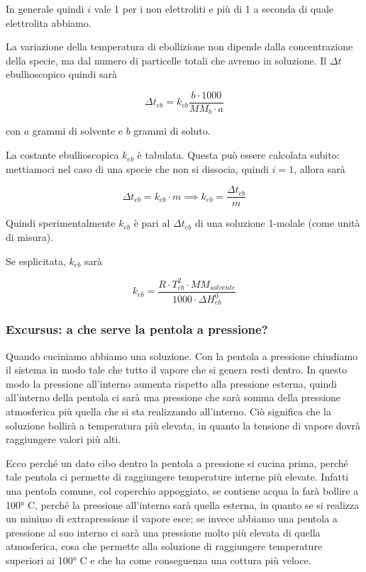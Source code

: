 In generale quindi $i$ vale 1 per i non elettroliti e più di 1 a seconda di quale elettrolita abbiamo.

\vspace{0.2cm}La variazione della temperatura di ebollizione non dipende dalla concentrazione della specie, ma dal numero di particelle totali che avremo in soluzione. Il $\Delta t$ ebullioscopico quindi sarà

$$\Delta t_{eb}=k_{eb} \frac{b \cdot 1000}{MM_b \cdot a}$$

con $a$ grammi di solvente e $b$ grammi di soluto.

La costante ebullioscopica $k_{eb}$ è tabulata. Questa può essere calcolata subito: mettiamoci nel caso di una specie che non si dissocia, quindi $i=1$, allora sarà

$$\Delta t_{eb}= k_{eb} \cdot m
\implies
k_{eb} = \frac{\Delta t_{eb}}{m}$$

Quindi sperimentalmente $k_{eb}$ è pari al $\Delta t_{eb}$ di una soluzione 1-molale (come unità di misura).

Se esplicitata, $k_{eb}$ sarà

$$k_{eb}=\frac{R \cdot T_{eb}^2 \cdot MM_{solvente}}{1000 \cdot \Delta H^0_{eb}}$$

\subsubsection{Excursus: a che serve la pentola a pressione?}
Quando cuciniamo abbiamo una soluzione. Con la pentola a pressione chiudiamo il sistema in modo tale che tutto il vapore che si genera resti dentro. In questo modo la pressione all'interno aumenta rispetto alla pressione esterna, quindi all'interno della pentola ci sarà una pressione che sarà somma della pressione atmosferica più quella che si sta realizzando all'interno. Ciò significa che la soluzione bollirà a temperatura più elevata, in quanto la tensione di vapore dovrà raggiungere valori più alti.

Ecco perché un dato cibo dentro la pentola a pressione si cucina prima, perché tale pentola ci permette di raggiungere temperature interne più elevate. Infatti una pentola comune, col coperchio appoggiato, se contiene acqua la farà bollire a 100° C, perché la pressione all'interno sarà quella esterna, in quanto se si realizza un minimo di extrapressione il vapore esce; se invece abbiamo una pentola a pressione al suo interno ci sarà una pressione molto più elevata di quella atmosferica, cosa che permette alla soluzione di raggiungere temperature superiori ai 100° C e che ha come conseguenza una cottura più veloce.
